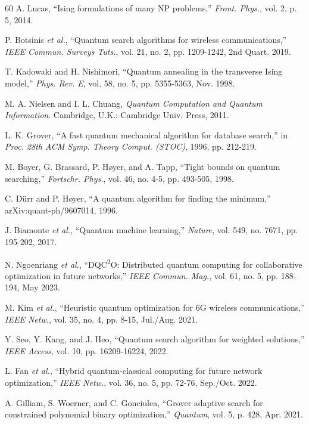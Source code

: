 \documentclass[journal]{IEEEtran}
\begin{document}
\begin{thebibliography}{60}
A. Lucas, ``Ising formulations of many NP problems,''
\emph{Front. Phys.}, vol. 2, p. 5, 2014.

P. Botsinis \emph{et al.}, ``Quantum search algorithms for wireless
communications,'' \emph{IEEE Commun. Surveys Tuts.}, vol. 21, no. 2,
pp. 1209-1242, 2nd Quart. 2019.

T. Kadowaki and H. Nishimori, ``Quantum annealing in the transverse
Ising model,'' \emph{Phys. Rev. E}, vol. 58, no. 5, pp. 5355-5363,
Nov. 1998.

M. A. Nielsen and I. L. Chuang, \emph{Quantum Computation and
Quantum Information}. Cambridge, U.K.: Cambridge Univ. Press, 2011.

L. K. Grover, ``A fast quantum mechanical algorithm for database
search,'' in \emph{Proc. 28th ACM Symp. Theory Comput. (STOC)},
1996, pp. 212-219.

M. Boyer, G. Brassard, P. H\o yer, and A. Tapp, ``Tight bounds on
quantum searching,'' \emph{Fortschr. Phys.}, vol. 46, no. 4-5,
pp. 493-505, 1998.

C. D\"urr and P. H\o yer, ``A quantum algorithm for finding the
minimum,'' arXiv:quant-ph/9607014, 1996.

J. Biamonte \emph{et al.}, ``Quantum machine learning,''
\emph{Nature}, vol. 549, no. 7671, pp. 195-202, 2017.

N. Ngoenriang \emph{et al.}, ``DQC\textsuperscript{2}O: Distributed
quantum computing for collaborative optimization in future
networks,'' \emph{IEEE Commun. Mag.}, vol. 61, no. 5, pp. 188-194,
May 2023.

M. Kim \emph{et al.}, ``Heuristic quantum optimization for 6G
wireless communications,'' \emph{IEEE Netw.}, vol. 35, no. 4,
pp. 8-15, Jul./Aug. 2021.

Y. Seo, Y. Kang, and J. Heo, ``Quantum search algorithm for
weighted solutions,'' \emph{IEEE Access}, vol. 10,
pp. 16209-16224, 2022.

L. Fan \emph{et al.}, ``Hybrid quantum-classical computing for
future network optimization,'' \emph{IEEE Netw.}, vol. 36, no. 5,
pp. 72-76, Sep./Oct. 2022.

A. Gilliam, S. Woerner, and C. Gonciulea, ``Grover adaptive search
for constrained polynomial binary optimization,'' \emph{Quantum},
vol. 5, p. 428, Apr. 2021.


\end{thebibliography}
\end{document}
